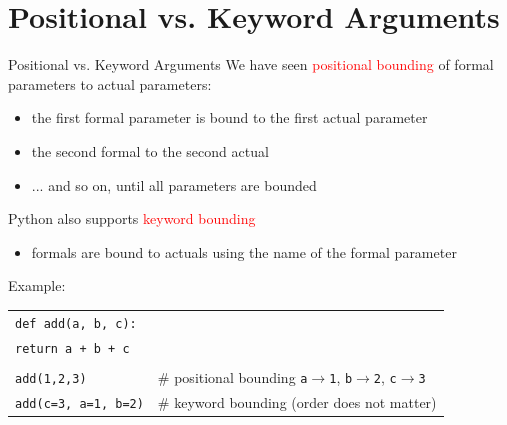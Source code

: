 \documentclass[t,handout,9pt]{beamer}
\begin{document}
\section{Positional vs. Keyword Arguments}
\begin{frame}{Positional vs. Keyword Arguments}
We have seen \textcolor{red}{positional bounding} of formal parameters to actual parameters:
\begin{itemize}
	\item the first formal parameter is bound to the first actual parameter
	\item the second formal to the second actual
	\item ... and so on, until all parameters are bounded
\end{itemize}
Python also supports \textcolor{red}{keyword bounding}
\begin{itemize}
	\item formals are bound to actuals using the name of the formal parameter
\end{itemize}
Example:
\begin{table}[]
\begin{flushleft}
\begin{tabular}{ll}
\texttt{def add(a, b, c):}        & \\
\texttt{\quad return a + b + c}        & \\
\texttt{\quad}        & \\
\texttt{add(1,2,3)}        & \# positional bounding \texttt{a$\rightarrow$1}, \texttt{b$\rightarrow$2}, \texttt{c$\rightarrow$3}\\
\texttt{add(c=3, a=1, b=2)}        & \# keyword bounding (order does not matter)\\
\end{tabular}
\end{flushleft}
\end{table}
\end{frame}
%
\end{document}
